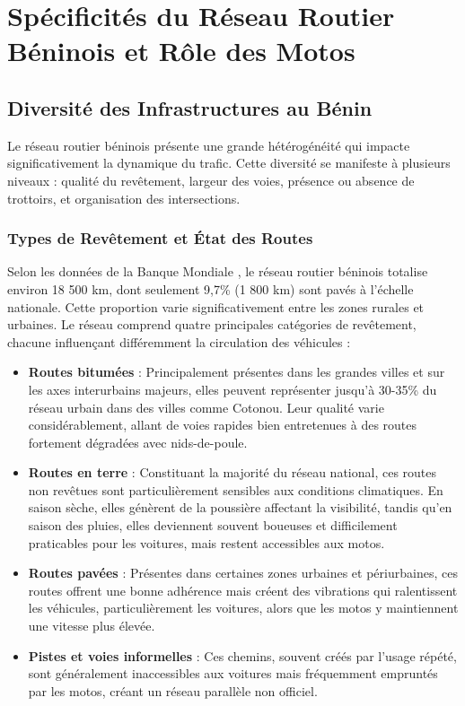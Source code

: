 \chapter{Spécificités du Réseau Routier Béninois et Rôle des Motos}
\label{chap:specificites_benin}

\section{Diversité des Infrastructures au Bénin}
\label{sec:diversite_infrastructures}

Le réseau routier béninois présente une grande hétérogénéité qui impacte significativement la dynamique du trafic. Cette diversité se manifeste à plusieurs niveaux : qualité du revêtement, largeur des voies, présence ou absence de trottoirs, et organisation des intersections.

\subsection{Types de Revêtement et État des Routes}
\label{subsec:types_revetement}

Selon les données de la Banque Mondiale \cite{worldbank2019benin}, le réseau routier béninois totalise environ 18 500 km, dont seulement 9,7\% (1 800 km) sont pavés à l'échelle nationale. Cette proportion varie significativement entre les zones rurales et urbaines. Le réseau comprend quatre principales catégories de revêtement, chacune influençant différemment la circulation des véhicules :

\begin{itemize}
\item \textbf{Routes bitumées} : Principalement présentes dans les grandes villes et sur les axes interurbains majeurs, elles peuvent représenter jusqu'à 30-35\% du réseau urbain dans des villes comme Cotonou. Leur qualité varie considérablement, allant de voies rapides bien entretenues à des routes fortement dégradées avec nids-de-poule.

\item \textbf{Routes en terre} : Constituant la majorité du réseau national, ces routes non revêtues sont particulièrement sensibles aux conditions climatiques. En saison sèche, elles génèrent de la poussière affectant la visibilité, tandis qu'en saison des pluies, elles deviennent souvent boueuses et difficilement praticables pour les voitures, mais restent accessibles aux motos.

\item \textbf{Routes pavées} : Présentes dans certaines zones urbaines et périurbaines, ces routes offrent une bonne adhérence mais créent des vibrations qui ralentissent les véhicules, particulièrement les voitures, alors que les motos y maintiennent une vitesse plus élevée.

\item \textbf{Pistes et voies informelles} : Ces chemins, souvent créés par l'usage répété, sont généralement inaccessibles aux voitures mais fréquemment empruntés par les motos, créant un réseau parallèle non officiel.
\end{itemize}

